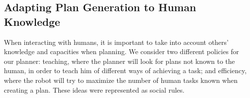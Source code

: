 



\subsection{Adapting Plan Generation to Human Knowledge}
\label{subsec:plan_generation-adapting_knowledge}
When interacting with humans, it is important to take into account others' knowledge and capacities when planning. We consider two different policies for our planner: teaching, where the planner will look for plans not known to the human, in order to teach him of different ways of achieving a task; and efficiency, where the robot will try to maximize the number of human tasks known when creating a plan. These ideas were represented as social rules.

